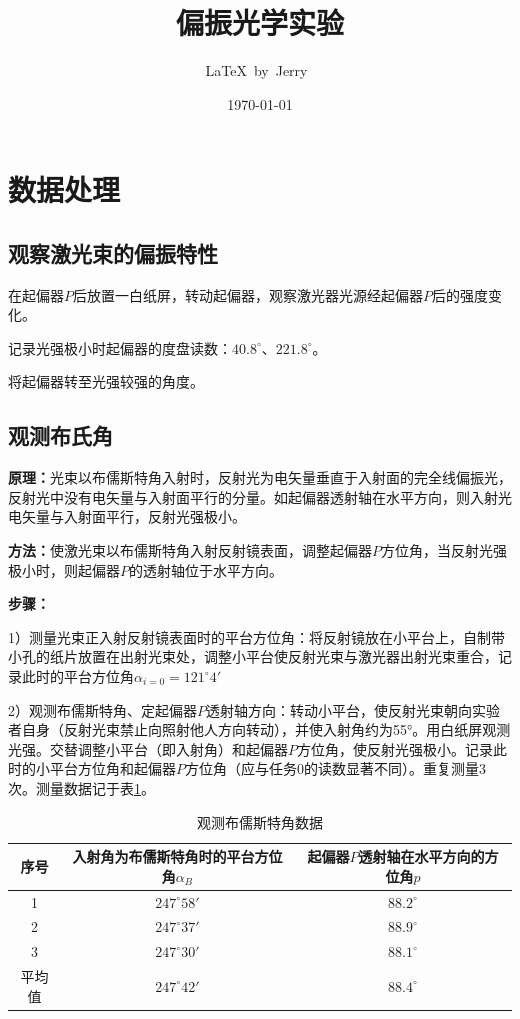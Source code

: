 \documentclass[UTF8]{ctexart}
\title{偏振光学实验}
\author{\LaTeX\ by\ Jerry\ }
\date{\today}
\newcommand\dg[2]{#1^{\circ}#2'}
\begin{document}
\fancyfoot[C]{\thepage}

\maketitle
\tableofcontents
\newpage

\section{数据处理}

\subsection{观察激光束的偏振特性}

在起偏器$P$后放置一白纸屏，转动起偏器，观察激光器光源经起偏器$P$后的强度变化。

记录光强极小时起偏器的度盘读数：$40.8^{\circ}$、$221.8^{\circ}$。

将起偏器转至光强较强的角度。

\subsection{观测布氏角}

\textbf{原理：}光束以布儒斯特角入射时，反射光为电矢量垂直于入射面的完全线偏振光，反射光中没有电矢量与入射面平行的分量。如起偏器透射轴在水平方向，则入射光电矢量与入射面平行，反射光强极小。

\textbf{方法：}使激光束以布儒斯特角入射反射镜表面，调整起偏器$P$方位角，当反射光强极小时，则起偏器$P$的透射轴位于水平方向。

\textbf{步骤：}

1）测量光束正入射反射镜表面时的平台方位角：将反射镜放在小平台上，自制带小孔的纸片放置在出射光束处，调整小平台使反射光束与激光器出射光束重合，记录此时的平台方位角$\alpha_{i=0}=\dg{121}{4}$

2）观测布儒斯特角、定起偏器$P$透射轴方向：转动小平台，使反射光束朝向实验者自身（反射光束禁止向照射他人方向转动），并使入射角约为55°。用白纸屏观测光强。交替调整小平台（即入射角）和起偏器$P$方位角，使反射光强极小。记录此时的小平台方位角和起偏器$P$方位角（应与任务0的读数显著不同）。重复测量3次。测量数据记于表\ref{tab:1.2.1}。

\begin{table}[h]
    \centering
    \begin{tabular}{|c|c|c|}
        \hline
        序号 & 入射角为布儒斯特角时的平台方位角$\alpha_B$ & 起偏器$P$透射轴在水平方向的方位角$p$ \\ \hline
        1 & $\dg{247}{58}$ & $88.2^{\circ}$ \\ \hline
        2 & $\dg{247}{37}$ & $88.9^{\circ}$ \\ \hline
        3 & $\dg{247}{30}$ & $88.1^{\circ}$ \\ \hline
        平均值 & $\dg{247}{42}$ & $88.4^{\circ}$ \\ \hline
    \end{tabular}
    \caption{观测布儒斯特角数据}
    \label{tab:1.2.1}
\end{table}
\end{document}
